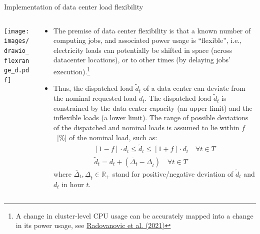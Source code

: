 \begin{frame}{Implementation of data center load flexibility}

{\footnotesize
  \begin{columns}[T]

  \begin{column}{6cm}
  \centering
  \vspace{0.2cm}
  \texttt{[image: images/drawio\_flexrange\_d.pdf]}
  \end{column}

  \begin{column}{9cm}
  \begin{itemize}
  \vspace{-0.1cm}
  \item The premise of data center flexibility is that a known number of computing jobs, and associated power usage is \enquote{flexible}, i.e., electricity loads can potentially be shifted in space (across datacenter locations), or to other times (by delaying jobs' execution).\footnote{{\scriptsize A change in cluster-level CPU usage can be accurately mapped into a change in its power usage, see \href{https://arxiv.org/abs/2106.11750}{Radovanovic et al. (2021)}}}

  \item Thus, the \alert{dispatched load $\widetilde{d}_t$} of a data center can deviate from the nominal requested load $d_t$. The dispatched load $\widetilde{d}_t$ is constrained by the data center capacity (an upper limit) and the inflexible loads (a lower limit). The range of possible deviations of the dispatched and nominal loads is assumed to lie within $f$~[\%] of the nominal load, such as:
  \begin{subequations}
    \begin{align}
      [1-f] \cdot d_t \le  \widetilde{d}_t  \le [1+f] \cdot d_t \quad \forall t \in T  
      \label{eqn:range} \\
      \widetilde{d}_t = d_t + (\overline{\Delta}_t - \underline{\Delta}_t) \quad \forall t \in T  
      \label{eqn:widetilde}
    \end{align}
  \end{subequations}
  \noindent where $\overline{\Delta}_t, \underline{\Delta}_t \in \mathbb{R}_{+}$ stand for positive/negative deviation of $\widetilde{d}_t$ and $d_t$ in hour $t$.
  \end{itemize}

  \end{column}
  \end{columns}
}
\end{frame}



